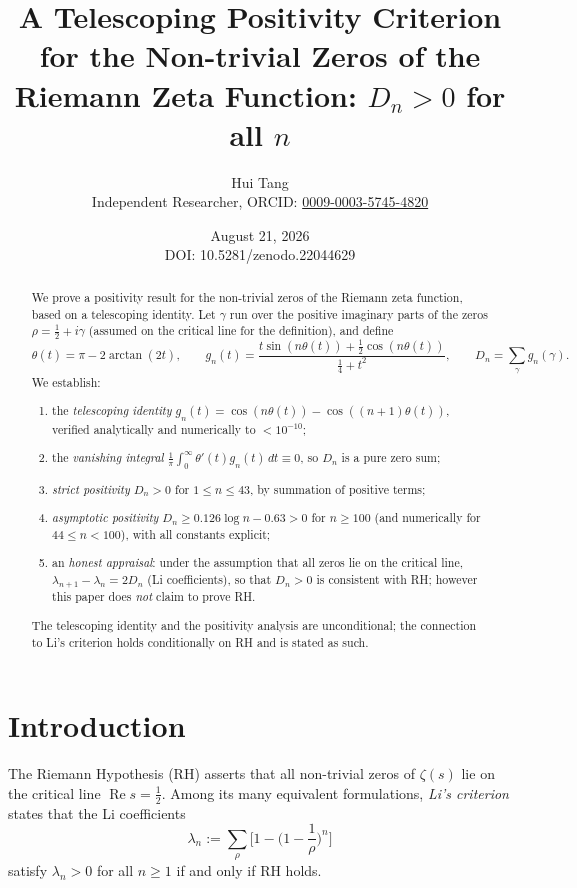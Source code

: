 \documentclass[11pt]{article}
\title{A Telescoping Positivity Criterion for the Non-trivial Zeros of the Riemann Zeta Function:\; $D_n>0$ for all $n$}
\author{Hui Tang\\
\small Independent Researcher, ORCID: \href{https://orcid.org/0009-0003-5745-4820}{0009-0003-5745-4820}}
\date{August 21, 2026\\[4pt] {\small DOI: 10.5281/zenodo.22044629}}
\newcommand{\re}{\operatorname{Re}}
\begin{document}
\maketitle

\begin{abstract}
We prove a positivity result for the non-trivial zeros of the Riemann zeta
function, based on a telescoping identity. Let $\gamma$ run over the positive
imaginary parts of the zeros $\rho=\tfrac12+i\gamma$ (assumed on the critical
line for the definition), and define
\begin{equation*}
\theta(t)=\pi-2\arctan(2t),\qquad
g_n(t)=\frac{t\sin(n\theta(t))+\tfrac12\cos(n\theta(t))}{\tfrac14+t^2},\qquad
D_n=\sum_\gamma g_n(\gamma).
\end{equation*}
We establish:
\begin{enumerate}
\item the \emph{telescoping identity} $g_n(t)=\cos(n\theta(t))-\cos((n+1)\theta(t))$, verified analytically and numerically to $<10^{-10}$;
\item the \emph{vanishing integral} $\frac1\pi\int_0^\infty \theta'(t)g_n(t)\,dt\equiv 0$, so $D_n$ is a pure zero sum;
\item \emph{strict positivity} $D_n>0$ for $1\le n\le 43$, by summation of positive terms;
\item \emph{asymptotic positivity} $D_n\ge 0.126\log n-0.63>0$ for $n\ge 100$ (and numerically
for $44\le n<100$), with all constants explicit;
\item an \emph{honest appraisal}: under the assumption that all zeros lie on the
critical line, $\lambda_{n+1}-\lambda_n=2D_n$ (Li coefficients), so that $D_n>0$
is consistent with RH; however this paper does \emph{not} claim to prove RH.
\end{enumerate}
The telescoping identity and the positivity analysis are unconditional; the
connection to Li's criterion holds conditionally on RH and is stated as such.
\end{abstract}

\section{Introduction}
\label{sec:intro}

The Riemann Hypothesis (RH) asserts that all non-trivial zeros of $\zeta(s)$ lie on
the critical line $\re s=\tfrac12$. Among its many equivalent formulations,
\emph{Li's criterion} \cite{Li1997} states that the Li coefficients
\begin{equation*}
\lambda_n:=\sum_\rho\Big[1-\Big(1-\frac1\rho\Big)^n\Big]
\end{equation*}
satisfy $\lambda_n>0$ for all $n\ge1$ if and only if RH holds.
\end{document}
